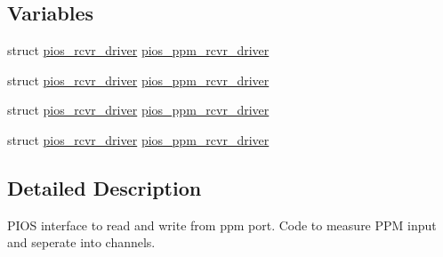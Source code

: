 \subsection*{Variables}
\begin{DoxyCompactItemize}
\item 
struct \hyperlink{structpios__rcvr__driver}{pios\-\_\-rcvr\-\_\-driver} \hyperlink{group___p_i_o_s___p_p_m_ga45134211ce1772871927ca3a1fbc2e20}{pios\-\_\-ppm\-\_\-rcvr\-\_\-driver}
\item 
struct \hyperlink{structpios__rcvr__driver}{pios\-\_\-rcvr\-\_\-driver} \hyperlink{group___p_i_o_s___p_p_m_ga45134211ce1772871927ca3a1fbc2e20}{pios\-\_\-ppm\-\_\-rcvr\-\_\-driver}
\item 
struct \hyperlink{structpios__rcvr__driver}{pios\-\_\-rcvr\-\_\-driver} \hyperlink{group___p_i_o_s___p_p_m_ga45134211ce1772871927ca3a1fbc2e20}{pios\-\_\-ppm\-\_\-rcvr\-\_\-driver}
\item 
struct \hyperlink{structpios__rcvr__driver}{pios\-\_\-rcvr\-\_\-driver} \hyperlink{group___p_i_o_s___p_p_m_ga45134211ce1772871927ca3a1fbc2e20}{pios\-\_\-ppm\-\_\-rcvr\-\_\-driver}
\end{DoxyCompactItemize}


\subsection{Detailed Description}
P\-I\-O\-S interface to read and write from ppm port. Code to measure P\-P\-M input and seperate into channels.


